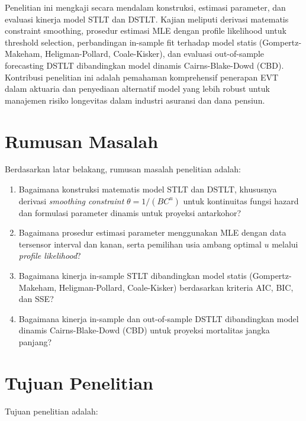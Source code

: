 Penelitian ini mengkaji secara mendalam konstruksi, estimasi parameter, dan evaluasi kinerja model STLT dan DSTLT. Kajian meliputi derivasi matematis constraint smoothing, prosedur estimasi MLE dengan profile likelihood untuk threshold selection, perbandingan in-sample fit terhadap model statis (Gompertz-Makeham, Heligman-Pollard, Coale-Kisker), dan evaluasi out-of-sample forecasting DSTLT dibandingkan model dinamis Cairns-Blake-Dowd (CBD). Kontribusi penelitian ini adalah pemahaman komprehensif penerapan EVT dalam aktuaria dan penyediaan alternatif model yang lebih robust untuk manajemen risiko longevitas dalam industri asuransi dan dana pensiun.

\section{Rumusan Masalah}

Berdasarkan latar belakang, rumusan masalah penelitian adalah:

\begin{enumerate}
    \item Bagaimana konstruksi matematis model STLT dan DSTLT, khususnya derivasi \textit{smoothing constraint} $\theta = 1/(BC^u)$ untuk kontinuitas fungsi hazard dan formulasi parameter dinamis untuk proyeksi antarkohor?

    \item Bagaimana prosedur estimasi parameter menggunakan MLE dengan data tersensor interval dan kanan, serta pemilihan usia ambang optimal $u$ melalui \textit{profile likelihood}?

    \item Bagaimana kinerja in-sample STLT dibandingkan model statis (Gompertz-Makeham, Heligman-Pollard, Coale-Kisker) berdasarkan kriteria AIC, BIC, dan SSE?

    \item Bagaimana kinerja in-sample dan out-of-sample DSTLT dibandingkan model dinamis Cairns-Blake-Dowd (CBD) untuk proyeksi mortalitas jangka panjang?
\end{enumerate}

\section{Tujuan Penelitian}

Tujuan penelitian adalah:


